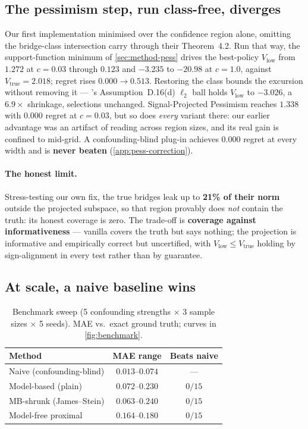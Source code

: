 \documentclass{article}
\theoremstyle{plain}
\theoremstyle{definition}
\begin{document}
\subsection{The pessimism step, run class-free, diverges}
\label{sec:exp-pess}
Our first implementation minimised over the confidence region alone, omitting the
bridge-class intersection \citet{hong2024} carry through their Theorem~4.2. Run
that way, the support-function minimum of \cref{sec:method-pess} drives the
best-policy $V_{\mathrm{low}}$ from $1.272$ at $c{=}0.03$ through $0.123$ and
$-3.235$ to $\mathbf{-20.98}$ at $c{=}1.0$, against $V_{\mathrm{true}}=2.018$;
regret rises $0.000\to0.513$. Restoring the class bounds the excursion without
removing it --- \citeauthor{hong2024}'s Assumption~D.16(d) $\ell_2$ ball holds
$V_{\mathrm{low}}$ to $-3.026$, a $6.9\times$ shrinkage, selections unchanged.
Signal-Projected Pessimism reaches $1.338$ with $0.000$ regret at $c{=}0.03$, but
so does \emph{every} variant there: our earlier advantage was an artifact of
reading across region sizes, and its real gain is confined to mid-grid. A
confounding-blind plug-in achieves $0.000$ regret at every width and is
\textbf{never beaten} (\cref{app:pess-correction}).

\paragraph{The honest limit.} Stress-testing our own fix, the true bridges leak
up to \textbf{21\% of their norm} outside the projected subspace, so that region
provably does \emph{not} contain the truth: its honest coverage is zero. The
trade-off is \textbf{coverage against informativeness} --- vanilla covers the
truth but says nothing; the projection is informative and empirically correct but
uncertified, with $V_{\mathrm{low}} \le V_{\mathrm{true}}$ holding by
sign-alignment in every test rather than by guarantee.

\subsection{At scale, a naive baseline wins}
\label{sec:exp-bench}
\begin{table}[t]
\caption{Benchmark sweep (5 confounding strengths $\times$ 3 sample sizes $\times$
5 seeds). MAE vs.\ exact ground truth; curves in \cref{fig:benchmark}.}
\label{tab:bench}
\vskip 0.1in
\begin{center}\small
\begin{tabular}{@{}lcc@{}}
\toprule
Method & MAE range & Beats naive \\
\midrule
Naive (confounding-blind) & $\mathbf{0.013}$--$\mathbf{0.074}$ & --- \\
Model-based (plain) & $0.072$--$0.230$ & $0/15$ \\
MB-shrunk (James--Stein) & $0.063$--$0.240$ & $0/15$ \\
Model-free proximal & $0.164$--$0.180$ & $0/15$ \\
\bottomrule
\end{tabular}
\end{center}
\vskip -0.15in
\end{table}
\end{document}
